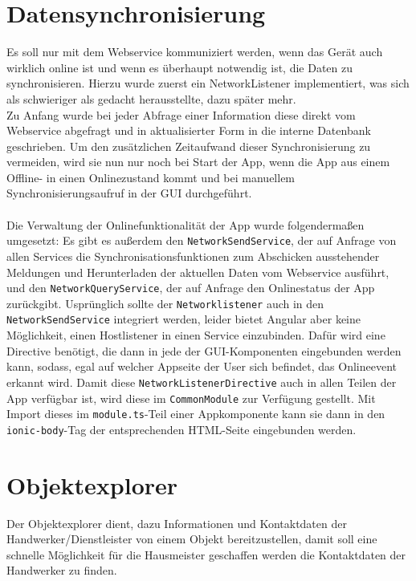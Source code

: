 \documentclass[12pt]{article}
\begin{document}
\section{Datensynchronisierung}
Es soll nur mit dem Webservice kommuniziert werden, wenn das Gerät auch wirklich online ist und wenn es überhaupt notwendig ist, die Daten zu synchronisieren. Hierzu wurde zuerst ein NetworkListener implementiert, was sich als schwieriger als gedacht herausstellte, dazu später mehr.\\
Zu Anfang wurde bei jeder Abfrage einer Information diese direkt vom Webservice abgefragt und in aktualisierter Form in die interne Datenbank geschrieben. Um den zusätzlichen Zeitaufwand dieser Synchronisierung zu vermeiden, wird sie nun nur noch bei Start der App, wenn die App aus einem Offline- in einen Onlinezustand kommt und bei manuellem Synchronisierungsaufruf in der GUI durchgeführt. 

\paragraph{}
Die Verwaltung der Onlinefunktionalität der App wurde folgendermaßen umgesetzt: Es gibt es außerdem den \texttt{NetworkSendService}, der auf Anfrage von allen Services die Synchronisationsfunktionen zum Abschicken ausstehender Meldungen und Herunterladen der aktuellen Daten vom Webservice ausführt, und den \texttt{NetworkQueryService}, der auf Anfrage den Onlinestatus der App zurückgibt. Usprünglich sollte der \texttt{Networklistener} auch in den \texttt{NetworkSendService} integriert werden, leider bietet Angular aber keine Möglichkeit, einen Hostlistener in einen Service einzubinden. Dafür wird eine Directive benötigt, die dann in jede der GUI-Komponenten eingebunden werden kann, sodass, egal auf welcher Appseite der User sich befindet, das Onlineevent erkannt wird. Damit diese \texttt{NetworkListenerDirective} auch in allen Teilen der App verfügbar ist, wird diese im \texttt{CommonModule} zur Verfügung gestellt. Mit Import dieses im \texttt{module.ts}-Teil einer Appkomponente kann sie dann in den \texttt{ionic-body}-Tag der entsprechenden HTML-Seite eingebunden werden.

\section{Objektexplorer}
Der Objektexplorer dient, dazu Informationen und Kontaktdaten der Handwerker/Dienstleister von einem Objekt bereitzustellen, damit soll eine schnelle Möglichkeit für die Hausmeister geschaffen werden die Kontaktdaten der Handwerker zu finden.
\end{document}
